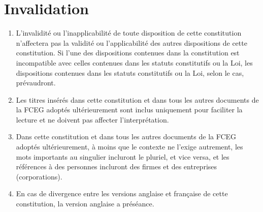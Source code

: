\section{Invalidation}
\label{invalidation}

\begin{enumerate}
 \item L'invalidité ou l'inapplicabilité de toute disposition de cette constitution n'affectera pas la validité ou l'applicabilité des autres dispositions de cette constitution. Si l'une des dispositions contenues dans la constitution est incompatible avec celles contenues dans les statuts constitutifs ou la Loi, les dispositions contenues dans les statuts constitutifs ou la Loi, selon le cas, prévaudront.
 \item Les titres insérés dans cette constitution et dans tous les autres documents de la FCEG adoptés ultérieurement sont inclus uniquement pour faciliter la lecture et ne doivent pas affecter l'interprétation.
 \item Dans cette constitution et dans tous les autres documents de la FCEG adoptés ultérieurement, à moins que le contexte ne l'exige autrement, les mots importants au singulier incluront le pluriel, et vice versa, et les références à des personnes incluront des firmes et des entreprises (corporations).
 \item En cas de divergence entre les versions anglaise et française de cette constitution, la version anglaise a préséance.
\end{enumerate}
